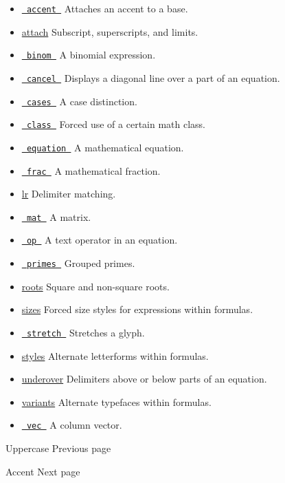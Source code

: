 \begin{itemize}
\tightlist
\item
  \href{/docs/reference/math/accent/}{\texttt{\ accent\ }} { Attaches an
  accent to a base. }
\item
  \href{/docs/reference/math/attach}{attach} { Subscript, superscripts,
  and limits. }
\item
  \href{/docs/reference/math/binom/}{\texttt{\ binom\ }} { A binomial
  expression. }
\item
  \href{/docs/reference/math/cancel/}{\texttt{\ cancel\ }} { Displays a
  diagonal line over a part of an equation. }
\item
  \href{/docs/reference/math/cases/}{\texttt{\ cases\ }} { A case
  distinction. }
\item
  \href{/docs/reference/math/class/}{\texttt{\ class\ }} { Forced use of
  a certain math class. }
\item
  \href{/docs/reference/math/equation/}{\texttt{\ equation\ }} { A
  mathematical equation. }
\item
  \href{/docs/reference/math/frac/}{\texttt{\ frac\ }} { A mathematical
  fraction. }
\item
  \href{/docs/reference/math/lr}{lr} { Delimiter matching. }
\item
  \href{/docs/reference/math/mat/}{\texttt{\ mat\ }} { A matrix. }
\item
  \href{/docs/reference/math/op/}{\texttt{\ op\ }} { A text operator in
  an equation. }
\item
  \href{/docs/reference/math/primes/}{\texttt{\ primes\ }} { Grouped
  primes. }
\item
  \href{/docs/reference/math/roots}{roots} { Square and non-square
  roots. }
\item
  \href{/docs/reference/math/sizes}{sizes} { Forced size styles for
  expressions within formulas. }
\item
  \href{/docs/reference/math/stretch/}{\texttt{\ stretch\ }} { Stretches
  a glyph. }
\item
  \href{/docs/reference/math/styles}{styles} { Alternate letterforms
  within formulas. }
\item
  \href{/docs/reference/math/underover}{underover} { Delimiters above or
  below parts of an equation. }
\item
  \href{/docs/reference/math/variants}{variants} { Alternate typefaces
  within formulas. }
\item
  \href{/docs/reference/math/vec/}{\texttt{\ vec\ }} { A column vector.
  }
\end{itemize}

\href{/docs/reference/text/upper/}{\pandocbounded{}}

{ Uppercase } { Previous page }

\href{/docs/reference/math/accent/}{\pandocbounded{}}

{ Accent } { Next page }
